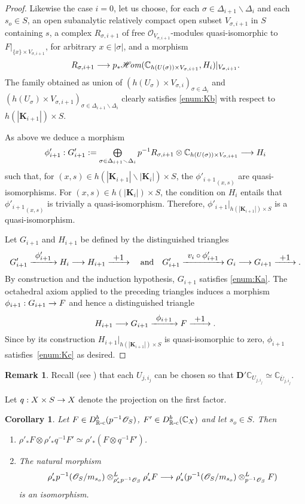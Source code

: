 \documentclass[english]{smfart}
\numberwithin{subsection}{section}
\newenvironment{enumeratea}
{\bgroup\def\theenumi{\alph{enumi}}\begin{enumerate}}
{\end{enumerate}\egroup}
\def\sho{\mathcal{O}}\let\cO\sho
\newcommand{\C}{\mathbb{C}}\let\CC\C
\newcommand{\R}{\mathbb{R}}\let\RR\R
\newcommand{\bD}{\boldsymbol{D}}
\newcommand{\bK}{\boldsymbol{K}}
\newcommand{\rc}{{\R\textup{-c}}}
\newcommand{\XS}{X\times S}
\let\ov\overline
\let\setminus\smallsetminus
\newcommand{\pOS}{p^{-1}\sho_S}
\numberwithin{equation}{section}
\theoremstyle{plain}
\newtheorem{corollary}[equation]{Corollary}
\theoremstyle{definition}
\newtheorem{remark}[equation]{Remark}
\def\to{\mathchoice{\longrightarrow}{\rightarrow}{\rightarrow}{\rightarrow}}
\def\To#1{\mathchoice{\xrightarrow{\textstyle\kern4pt#1\kern3pt}}{\stackrel{#1}{\longrightarrow}}{}{}}
\let\oldbigoplus\bigoplus
\renewcommand{\bigoplus}{\mathop{\textstyle\oldbigoplus}\displaylimits}
\begin{document}
\begin{proof}
Likewise the case $i=0$, let us choose, for each $\sigma\in\Delta_{i+1}\setminus\Delta_i$ and each $s_o\in S$, an open subanalytic relatively compact open subset $V_{\sigma,i+1}$ in $S$ containing $s$, a complex $R_{\sigma,i+1}$ of free $\sho_{V_{\sigma,i+1}}$-modules quasi-isomorphic to $F|_{\{x\}\times V_{\sigma,i+1}}$, for arbitrary $x\in |\sigma|$, and a morphism
$$
R_{\sigma,i+1}\to p_*\ho(\CC_{h(U(\sigma))\times V_{\sigma,i+1}}, H_i)|_{V_{\sigma,i+1}}.
$$
The family obtained as union of $(h(U_{\sigma})\times V_{\sigma,i})_{\sigma\in \Delta_i}$ and $(h(U_{\sigma})\times V_{\sigma,i+1})_{\sigma\in \Delta_{i+1}\setminus \Delta_i}$ clearly satisfies \eqref{enum:Kb} with respect to $h(|\bK_{i+1}|)\times S$.

As above we deduce a morphism
$$
\phi'_{i+1}:G'_{i+1}:=\bigoplus_{\sigma\in\Delta_{i+1}\setminus\Delta_i} p^{-1}R_{\sigma,i+1}\otimes \CC_{h(U(\sigma))\times V_{\sigma,i+1}}\to H_i
$$
such that, for $(x,s)\in h(|\bK_{i+1}|\setminus |\bK_{i}|)\times S$, the ${\phi'_{i+1}}_{(x,s)}$ are quasi-isomorphisms. For $(x,s)\in h(|\bK_i|)\times S$, the condition on $H_i$ entails that ${\phi'_{i+1}}_{(x,s)}$ is trivially a quasi-isomorphism. Therefore, $\phi'_{i+1}|_{h(|\bK_{i+1}|)\times S}$ is a quasi-isomorphism.

Let $G_{i+1}$ and $H_{i+1}$ be defined by the distinguished triangles
$$G'_{i+1}\To{\phi'_{i+1}}H_i\to H_{i+1}\To{+1}\quad\text{and}\quad
G'_{i+1}\To{v_i\circ\phi'_{i+1}} G_i\to G_{i+1}\To{+1}.$$
By construction and the induction hypothesis, $G_{i+1}$ satisfies \eqref{enum:Ka}. The octahedral axiom applied to the preceding triangles induces a morphism $\phi_{i+1}: G_{i+1}\to F$ and hence a distinguished triangle
$$H_{i+1}\to G_{i+1}\To{\phi_{i+1}}F\To{+1}.$$
Since by its construction ${H_{i+1}}|_{h(|\bK_{i+1}|)\times S}$ is quasi-isomorphic to zero, $\phi_{i+1}$ satisfies~\eqref{enum:Kc} as desired.
\end{proof}
\begin{remark}
\label{lct}
Recall (see \cite[Prop.\,3.9]{Sch-Sch94}) that each $U_{j,i_j}$ can be chosen so that $\bD'\CC_{U_{j,i_j}}\simeq\CC_{\ov U_{j,i_j}}$.
\end{remark}

Let $q:\XS\to X$ denote the projection on the first factor.

\begin{corollary}\label{L:210}
Let $F \in D^b_\rc(\pOS)$, $F'\in D^b_\rc(\C_X)$ and let $s_o\in S$. Then
\begin{enumeratea}
\item\label{L:210a}
$\rho'_*F \otimes \rho'_*q^{-1}F' \simeq \rho'_*(F \otimes q^{-1}F')$.

\item\label{L:210b}
The natural morphism
\[
\rho'_*p^{-1}(\sho_S/\mathfrak{m}_{s_o})\otimes^L_{\rho'_*p^{-1}\sho_S}\rho'_*F\to \rho'_*(p^{-1}(\sho_S/\mathfrak{m}_{s_o})\otimes^L_{p^{-1}\sho_S}F)
\]
is an isomorphism.
\end{enumeratea}
\end{corollary}
\end{document}
